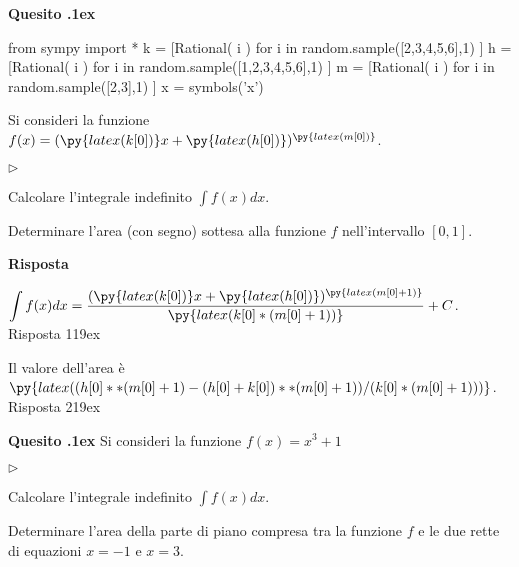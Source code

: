 \documentclass[11pt,twoside,a4paper]{article}
\newcommand{\mylabel}[1]{#1\hfill}
\renewenvironment{itemize}
  {\begin{list}{$\triangleright$}{%
   \setlength{\parskip}{0mm}
   \setlength{\topsep}{.4\baselineskip}
   \setlength{\rightmargin}{0mm}
   \setlength{\listparindent}{0mm}
   \setlength{\itemindent}{0mm}
   \setlength{\labelwidth}{2ex}
   \setlength{\itemsep}{.4\baselineskip}
   \setlength{\parsep}{0mm}
   \setlength{\partopsep}{0mm}
   \setlength{\labelsep}{1ex}
   \setlength{\leftmargin}{\labelwidth+\labelsep}
   \let\makelabel\mylabel}}{%
   \end{list}\vspace*{-1.3mm}}
\newcounter{quesito}
\newenvironment{question}{\addtocounter{quesito}{1}\par\textbf{Quesito \thequesito.\kern1ex}}{\vspace{0.5\parskip}}
\newenvironment{answer}{\par\textbf{Risposta\quad}}{\vspace{\parskip}}
\begin{document}
\begin{question}
\begin{pycode}
from sympy import *
k = [Rational( i ) for i in random.sample([2,3,4,5,6],1) ]
h = [Rational( i ) for i in random.sample([1,2,3,4,5,6],1) ]
m = [Rational( i ) for i in random.sample([2,3],1) ]
x = symbols('x')
\end{pycode}
Si consideri la funzione $f(x) = (\py{latex(k[0])}x+\py{latex(h[0])})^{\py{latex(m[0])}}$.
\begin{itemize}
\item[1.] Calcolare l'integrale indefinito $\displaystyle \int f(x) dx$.
\item[2.] Determinare l'area (con segno) sottesa alla funzione $f$ nell'intervallo $[0,1]$.
\end{itemize}
\begin{answer}

{\color{blue}
$\displaystyle \int f(x) dx = \frac{(\py{latex(k[0])}x+\py{latex(h[0])})^{\py{latex(m[0]+1)}}}{\py{latex(k[0]*(m[0]+1))}} + C$.
\hfill Risposta 1\kern19ex}

\smallskip
{\color{blue} Il valore dell'area è $\py{latex((h[0]**(m[0]+1)-(h[0]+k[0])**(m[0]+1))/(k[0]*(m[0]+1)))}$.
\hfill Risposta 2\kern19ex}

\end{answer}
\end{question}


\begin{question}
Si consideri la funzione $f(x) = x^3 + 1$
\begin{itemize}
\item[1.] Calcolare l'integrale indefinito $\displaystyle \int f(x) dx$.
\item[2.] Determinare l'area della parte di piano compresa tra la funzione $f$ e le due rette di equazioni $x = -1$ e $x = 3$.
\end{itemize}
\end{question}
\end{document}
